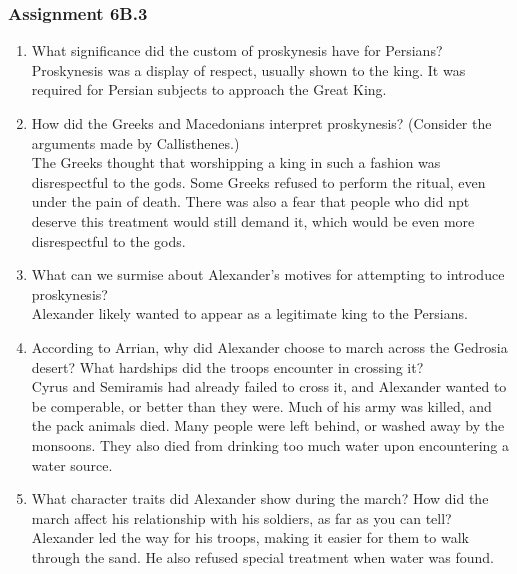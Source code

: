\documentclass{article}
\begin{document}
\subsubsection*{Assignment 6B.3}
\begin{enumerate}
  \item What significance did the custom of proskynesis have for Persians? \\
  Proskynesis was a display of respect, usually shown to the king. It was required for Persian
  subjects to approach the Great King.
  \item How did the Greeks and Macedonians interpret proskynesis? (Consider the
  arguments made by Callisthenes.) \\
  The Greeks thought that worshipping a king in such a fashion was disrespectful to the gods.
  Some Greeks refused to perform the ritual, even under the pain of death. There was also a
  fear that people who did npt deserve this treatment would still demand it, which would be
  even more disrespectful to the gods.
  \item What can we surmise about Alexander’s motives for attempting to introduce proskynesis? \\
  Alexander likely wanted to appear as a legitimate king to the Persians.
  \item According to Arrian, why did Alexander choose to march across the Gedrosia desert?
  What hardships did the troops encounter in crossing it? \\
  Cyrus and Semiramis had already failed to cross it, and Alexander wanted to be comperable,
  or better than they were. Much of his army was killed, and the pack animals died. Many people
  were left behind, or washed away by the monsoons. They also died from drinking too much
  water upon encountering a water source.
  \item What character traits did Alexander show during the march? How did the march
  affect his relationship with his soldiers, as far as you can tell? \\
  Alexander led the way for his troops, making it easier for them to walk through the sand.
  He also refused special treatment when water was found.
\end{enumerate}
\end{document}
